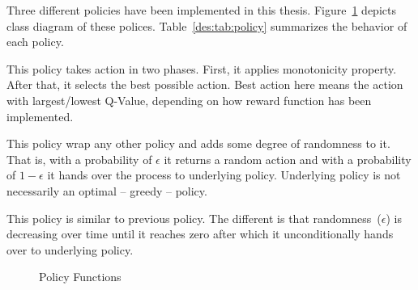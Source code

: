 Three different policies have been implemented in this thesis. Figure~\ref{des:f:policy} depicts class diagram of these polices. Table~\ref{des:tab:policy} summarizes the behavior of each policy.
\begin{description}[leftmargin=0pt]
    \item[Greedy Policy] This policy takes action in two phases. First, it applies monotonicity property. After that, it selects the best possible action. Best action here means the action with largest/lowest Q-Value, depending on how reward function has been implemented.
    \item[One Minus Epsilon Policy] This policy wrap any other policy and adds some degree of randomness to it. That is, with a probability of $\epsilon$ it returns a random action and with a probability of $1-\epsilon$ it hands over the process to underlying policy. Underlying policy is not necessarily an optimal -- greedy -- policy.
    \item[Decreasing One Minus Epsilon Policy] This policy is similar to previous policy. The different is that randomness~($\epsilon$) is decreasing over time until it reaches zero after which it unconditionally hands over to underlying policy.
\end{description}
\begin{figure}[H]
    \centering
    \caption{Policy Functions}
    \label{des:f:policy}
\end{figure}
